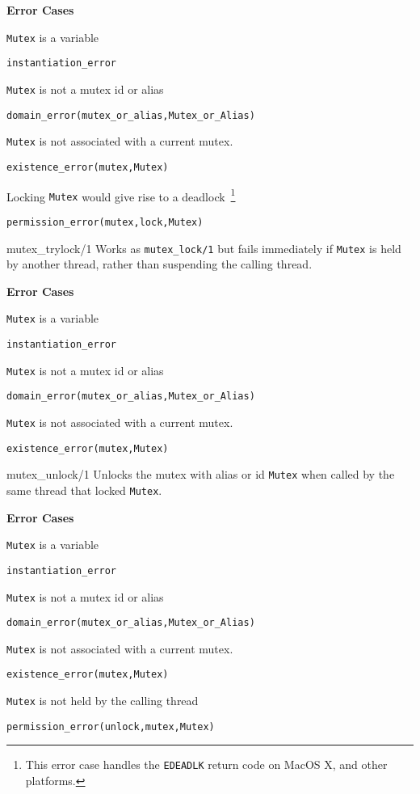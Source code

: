 \begin{description}
{\bf Error Cases}
\bi
\item 	{\tt Mutex} is a variable
\bi
\item 	{\tt instantiation\_error}
\ei
%
\item 	{\tt Mutex} is not a mutex id or alias
\bi
\item 	{\tt domain\_error(mutex\_or\_alias,Mutex\_or\_Alias)}
\ei
%
\item 	{\tt Mutex} is not associated with a current mutex.
\bi
\item 	{\tt existence\_error(mutex,Mutex)}
\ei
\item Locking {\tt Mutex} would give rise to a deadlock~\footnote{This
  error case handles the {\tt EDEADLK} return code on MacOS X, and other
  platforms.}
\bi
\item 	{\tt permission\_error(mutex,lock,Mutex)}
\ei
\ei

{mutex\_trylock/1}
%
Works as {\tt mutex\_lock/1} but fails immediately if {\tt Mutex} is
held by another thread,  rather than suspending the calling thread.

{\bf Error Cases}
\bi
\item 	{\tt Mutex} is a variable
\bi
\item 	{\tt instantiation\_error}
\ei
%
\item 	{\tt Mutex} is not a mutex id or alias
\bi
\item 	{\tt domain\_error(mutex\_or\_alias,Mutex\_or\_Alias)}
\ei
%
\item 	{\tt Mutex} is not associated with a current mutex.
\bi
\item 	{\tt existence\_error(mutex,Mutex)}
\ei
\ei

{mutex\_unlock/1}
%
Unlocks the mutex with alias or id {\tt Mutex} when called by the same
thread that locked {\tt Mutex}.

{\bf Error Cases}
\bi
\item 	{\tt Mutex} is a variable
\bi
\item 	{\tt instantiation\_error}
\ei
%
\item 	{\tt Mutex} is not a mutex id or alias
\bi
\item 	{\tt domain\_error(mutex\_or\_alias,Mutex\_or\_Alias)}
\ei
%
\item 	{\tt Mutex} is not associated with a current mutex.
\bi
\item 	{\tt existence\_error(mutex,Mutex)}
\ei
\item 	{\tt Mutex} is not held by the calling thread
\bi
\item 	{\tt permission\_error(unlock,mutex,Mutex)}
\ei
\ei


\end{description}

